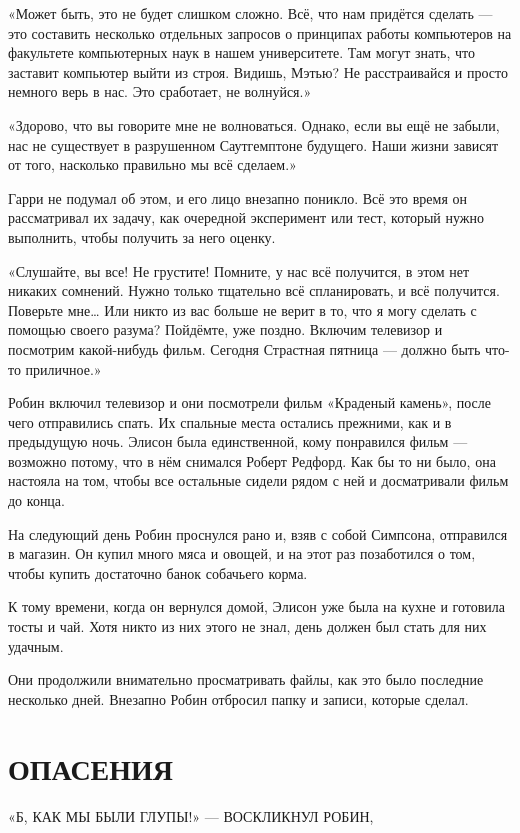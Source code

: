 \documentclass[a5paper, 9pt,
final, openany, twoside=true]{memoir}
\begin{document}
«Может быть, это не будет слишком сложно. Всё, что нам придётся сделать — это составить несколько отдельных запросов о принципах работы компьютеров на факультете компьютерных наук в нашем университете. Там могут знать, что заставит компьютер выйти из строя. Видишь, Мэтью? Не расстраивайся и просто немного верь в нас. Это сработает, не волнуйся.»

«Здорово, что вы говорите мне не волноваться. Однако, если вы ещё не забыли, нас не существует в разрушенном Саутгемптоне будущего. Наши жизни зависят от того, насколько правильно мы всё сделаем.»

Гарри не подумал об этом, и его лицо внезапно поникло. Всё это время он рассматривал их задачу, как очередной эксперимент или тест, который нужно выполнить, чтобы получить за него оценку.

«Слушайте, вы все! Не грустите! Помните, у нас всё получится, в этом нет никаких сомнений. Нужно только тщательно всё спланировать, и всё получится. Поверьте мне… Или никто из вас больше не верит в то, что я могу сделать с помощью своего разума? Пойдёмте, уже поздно. Включим телевизор и посмотрим какой-нибудь фильм. Сегодня Страстная пятница — должно быть что-то приличное.»\bigskip

Робин включил телевизор и они посмотрели фильм «Краденый камень», после чего отправились спать. Их спальные места остались прежними, как и в предыдущую ночь. Элисон была единственной, кому понравился фильм — возможно потому, что в нём снимался Роберт Редфорд. Как бы то ни было, она настояла на том, чтобы все остальные сидели рядом с ней и досматривали фильм до конца.\bigskip

На следующий день Робин проснулся рано и, взяв с собой Симпсона, отправился в магазин. Он купил много мяса и овощей, и на этот раз позаботился о том, чтобы купить достаточно банок собачьего корма.

К тому времени, когда он вернулся домой, Элисон уже была на кухне и готовила тосты и чай. Хотя никто из них этого не знал, день должен был стать для них удачным.\bigskip

Они продолжили внимательно просматривать файлы, как это было последние несколько дней. Внезапно Робин отбросил папку и записи, которые сделал.
\chapter{ОПАСЕНИЯ}
«Б{, КАК МЫ БЫЛИ ГЛУПЫ!» — ВОСКЛИКНУЛ РОБИН},
\end{document}
